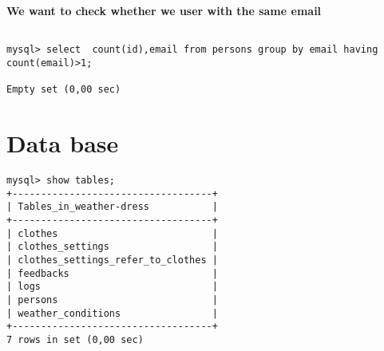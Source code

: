 \documentclass[]{article}
\begin{document}
\textbf{We want to check whether we user with the same email}

\begin{verbatim}

mysql> select  count(id),email from persons group by email having count(email)>1;

Empty set (0,00 sec)

\end{verbatim}



\section{Data base}

\begin{verbatim}
mysql> show tables;
+-----------------------------------+
| Tables_in_weather-dress           |
+-----------------------------------+
| clothes                           |
| clothes_settings                  |
| clothes_settings_refer_to_clothes |
| feedbacks                         |
| logs                              |
| persons                           |
| weather_conditions                |
+-----------------------------------+
7 rows in set (0,00 sec)
\end{verbatim}
\end{document}
